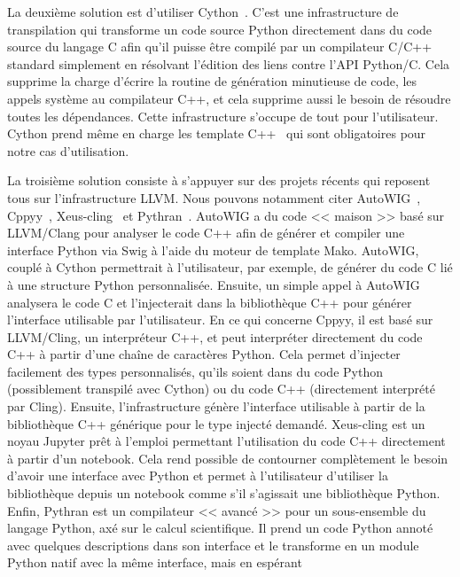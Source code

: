 La deuxième solution est d'utiliser Cython~\parencite{behnel.2010.cython}. C'est une infrastructure de transpilation qui
transforme un code source Python directement dans du code source du langage C afin qu'il puisse être compilé par un
compilateur C/C++ standard simplement en résolvant l'édition des liens contre l'API Python/C. Cela supprime la charge
d'écrire la routine de génération minutieuse de code, les appels système au compilateur C++, et cela supprime aussi le
besoin de résoudre toutes les dépendances. Cette infrastructure s'occupe de tout pour l'utilisateur. Cython prend même
en charge les template C++~\parencite{behnel.2022.cython-template} qui sont obligatoires pour notre cas d'utilisation.

La troisième solution consiste à s'appuyer sur des projets récents qui reposent tous sur l'infrastructure LLVM. Nous
pouvons notamment citer AutoWIG~\parencite{fernique.2018.autowig}, Cppyy~\parencite{wimtlplavrijsen.2016.cppyy},
Xeus-cling~\parencite{quantstack.2021.xeus-cling} et Pythran~\parencite{guelton.2015.pythran}. AutoWIG a du code <<
maison >> basé sur LLVM/Clang pour analyser le code C++ afin de générer et compiler une interface Python via Swig à
l'aide du moteur de template Mako. AutoWIG, couplé à Cython permettrait à l'utilisateur, par exemple, de générer du code
C lié à une structure Python personnalisée. Ensuite, un simple appel à AutoWIG analysera le code C et l'injecterait
dans la bibliothèque C++ pour générer l'interface utilisable par l'utilisateur. En ce qui concerne Cppyy, il est basé
sur LLVM/Cling, un interpréteur C++, et peut interpréter directement du code C++ à partir d'une chaîne de caractères
Python. Cela permet d'injecter facilement des types personnalisés, qu'ils soient dans du code Python (possiblement
transpilé avec Cython) ou du code C++ (directement interprété par Cling). Ensuite, l'infrastructure génère l'interface
utilisable à partir de la bibliothèque C++ générique pour le type injecté demandé. Xeus-cling est un noyau Jupyter prêt
à l'emploi permettant l'utilisation du code C++ directement à partir d'un notebook. Cela rend possible de contourner
complètement le besoin d'avoir une interface avec Python et permet à l'utilisateur d'utiliser la bibliothèque depuis un
notebook comme s'il s'agissait une bibliothèque Python. Enfin, Pythran est un compilateur << avancé >> pour un
sous-ensemble du langage Python, axé sur le calcul scientifique. Il prend un code Python annoté avec quelques
descriptions dans son interface et le transforme en un module Python natif avec la même interface, mais en espérant
